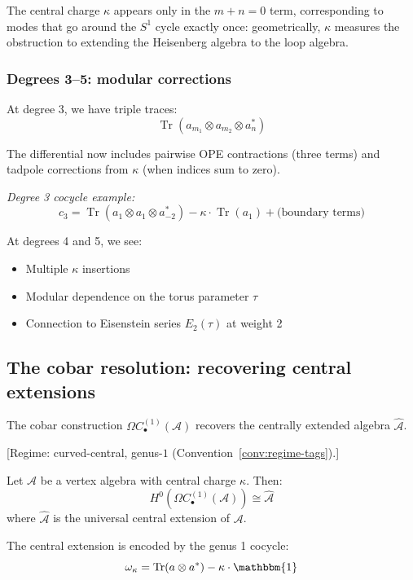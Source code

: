 The central charge $\kappa$ appears only in the $m+n=0$ term, corresponding to modes that go around the $S^1$ cycle exactly once: geometrically, $\kappa$ measures the obstruction to extending the Heisenberg algebra to the loop algebra.

\subsubsection{Degrees 3--5: modular corrections}

At degree 3, we have triple traces:
\[\operatorname{Tr}(a_{m_1} \otimes a_{m_2} \otimes a^*_n)\]

The differential now includes pairwise OPE contractions (three terms) and tadpole corrections from $\kappa$ (when indices sum to zero).

\emph{Degree 3 cocycle example:}
\[c_3 = \operatorname{Tr}(a_1 \otimes a_1 \otimes a^*_{-2}) 
- \kappa \cdot \operatorname{Tr}(a_1) + \text{(boundary terms)}\]

At degrees 4 and 5, we see:
\begin{itemize}
\item Multiple $\kappa$ insertions
\item Modular dependence on the torus parameter $\tau$
\item Connection to Eisenstein series $E_2(\tau)$ at weight 2
\end{itemize}

\subsection{The cobar resolution: recovering central extensions}

The cobar construction $\Omega C_{\bullet}^{(1)}(\mathcal{A})$ recovers the
centrally extended algebra $\widehat{\mathcal{A}}$.

\begin{theorem}\label{thm:genus1-cobar-bar}
\textup{[Regime: curved-central, genus-$1$
\textup{(}Convention~\textup{\ref{conv:regime-tags})}.]}

Let $\mathcal{A}$ be a vertex algebra with central charge $\kappa$. Then:
\[H^0(\Omega C_{\bullet}^{(1)}(\mathcal{A})) \cong \widehat{\mathcal{A}}\]
where $\widehat{\mathcal{A}}$ is the universal central extension of $\mathcal{A}$.

The central extension is encoded by the genus 1 cocycle:
\[\omega_{\kappa} = \operatorname{Tr}(a \otimes a^*) - \kappa \cdot \mathbbm{1}\]
\end{theorem}

